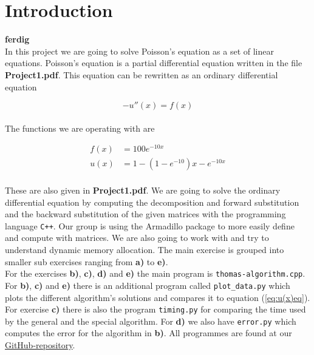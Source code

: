 \documentclass{article}
\begin{document}
\vspace{1cm}

\section{Introduction} \label{sec:Introduction}

{\large \bf ferdig} \\

In this project we are going to solve Poisson's equation as a set of linear equations. Poisson's equation is a partial differential equation written in the file \textbf{Project1.pdf}. This equation can be rewritten as an ordinary differential equation

\begin{equation}
  - u''(x) = f(x)   \label{eq:u(x)diffeq}
\end{equation} \\

The functions we are operating with are

\begin{align}
  f(x) &= 100 e ^{-10 x}    \label{eq:f(x)eq} \\
  u(x) &= 1 - (1- e ^{-10}) x - e ^{- 10 x} \label{eq:u(x)eq}
\end{align} \\

These are also given in \textbf{Project1.pdf}. We are going to solve the ordinary differential equation by computing the decomposition and forward substitution and the backward substitution of the given matrices with the programming language \texttt{C++}. Our group is using the Armadillo package to more easily define and compute with matrices. We are also going to work with and try to understand dynamic memory allocation. The main exercise is grouped into smaller sub exercises ranging from \textbf{a)} to \textbf{e)}. \\

For the exercises \textbf{b)}, \textbf{c)}, \textbf{d)} and \textbf{e)} the main program is \texttt{thomas-algorithm.cpp}. For \textbf{b)}, \textbf{c)} and \textbf{e)} there is an additional program called \texttt{plot\_data.py} which plots the different algorithm's solutions and compares it to equation (\ref{eq:u(x)eq}). For exercise \textbf{c)} there is also the program \texttt{timing.py} for comparing the time used by the general and the special algorithm. For \textbf{d)} we also have \texttt{error.py} which computes the error for the algorithm in \textbf{b)}.
All programmes are found at our \href{https://github.com/Erikbgram/Fys3150}{GitHub-repository}. \\
\end{document}
